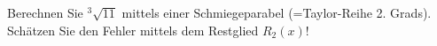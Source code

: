 \item 
Berechnen Sie $^3\sqrt{11}$ mittels einer Schmiegeparabel (=Taylor-Reihe 2. Grads). Schätzen Sie den Fehler mittels dem Restglied $R_2(x)$!

